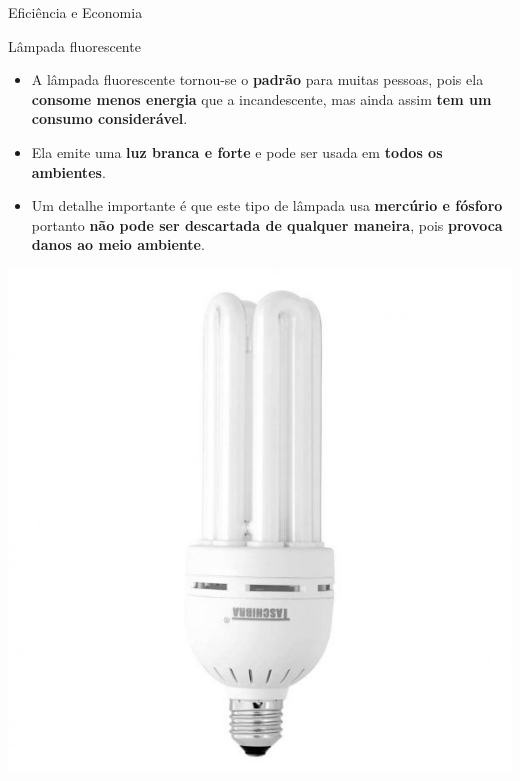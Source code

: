 \begin{frame}{Eficiência e Economia}
	\begin{block}{Lâmpada fluorescente}
		\begin{itemize}
			\item A lâmpada fluorescente tornou-se o \textbf{padrão} para muitas pessoas, pois ela \textbf{consome menos energia} que a incandescente, mas ainda assim \textbf{tem um consumo considerável}.
			\item Ela emite uma \textbf{luz branca e forte} e pode ser usada em \textbf{todos os ambientes}.
			\item Um detalhe importante é que este tipo de lâmpada usa \textbf{mercúrio e fósforo} portanto \textbf{não pode ser descartada de qualquer maneira}, pois \textbf{provoca danos ao meio ambiente}.
		\end{itemize}
	\end{block}

	\centering
	\includegraphics[height=0.35\textheight]{Figuras/Ch07/fig10}
\end{frame}


